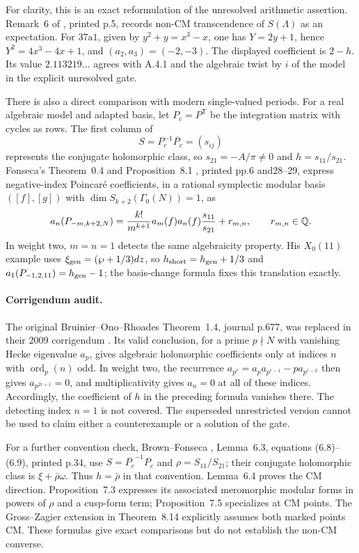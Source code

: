 For clarity, this is an exact reformulation of the unresolved arithmetic assertion. Remark~6 of \cite{EllAGOR2015}, printed p.5, records non-CM transcendence of $S(\Lambda)$ as an expectation. For $37\mathrm a1$, given by $y^2+y=x^3-x$, one has $Y=2y+1$, hence $Y^2=4x^3-4x+1$, and $(a_2,a_3)=(-2,-3)$. The displayed coefficient is $2-h$. Its value $2.113219\ldots$ agrees with A.4.1 and the algebraic twist by $i$ of the model in the explicit unresolved gate.

There is also a direct comparison with modern single-valued periods. For a real algebraic model and adapted basis, let $P_c=P^{\mathsf T}$ be the integration matrix with cycles as rows. The first column of
\[
 S=P_c^{-1}\overline{P_c}=(s_{ij})
\]
represents the conjugate holomorphic class, so $s_{21}=-A/\pi\ne0$ and $h=s_{11}/s_{21}$. Fonseca's Theorem~0.4 and Proposition~8.1 \cite{EllFonseca2020}, printed pp.6 and28--29, express negative-index Poincar\'e coefficients, in a rational symplectic modular basis $([f],[g])$ with $\dim S_{k+2}(\Gamma_0(N))=1$, as
\[
 a_n(P_{-m,k+2,N})
 =\frac{k!}{m^{k+1}}a_m(f)a_n(f)\frac{s_{11}}{s_{21}}+r_{m,n},
 \qquad r_{m,n}\in\mathbb Q.
\]
In weight two, $m=n=1$ detects the same algebraicity property. His $X_0(11)$ example uses $\xi_{\rm gen}=(\wp+1/3)dz$, so $h_{\rm short}=h_{\rm gen}+1/3$ and $a_1(P_{-1,2,11})=h_{\rm gen}-1$; the basis-change formula fixes this translation exactly.

\paragraph{Corrigendum audit.}
The original Bruinier--Ono--Rhoades Theorem~1.4, journal p.677, was replaced in their 2009 corrigendum \cite{EllBORCorr2009}. Its valid conclusion, for a prime $p\nmid N$ with vanishing Hecke eigenvalue $a_p$, gives algebraic holomorphic coefficients only at indices $n$ with $\operatorname{ord}_p(n)$ odd. In weight two, the recurrence
$a_{p^r}=a_p a_{p^{r-1}}-p a_{p^{r-2}}$
then gives $a_{p^{2r+1}}=0$, and multiplicativity gives $a_n=0$ at all of these indices. Accordingly, the coefficient of $h$ in the preceding formula vanishes there. The detecting index $n=1$ is not covered. The superseded unrestricted version cannot be used to claim either a counterexample or a solution of the gate.

For a further convention check, Brown--Fonseca \cite{EllBrownFonseca2025}, Lemma~6.3, equations (6.8)--(6.9), printed p.34, use $S=\overline{P_c}^{-1}P_c$ and $\rho=S_{11}/S_{21}$; their conjugate holomorphic class is $\xi+\bar\rho\omega$. Thus $h=\bar\rho$ in that convention. Lemma~6.4 proves the CM direction. Proposition~7.3 expresses its associated meromorphic modular forms in powers of $\rho$ and a cusp-form term; Proposition~7.5 specializes at CM points. The Gross--Zagier extension in Theorem~8.14 explicitly assumes both marked points CM. These formulas give exact comparisons but do not establish the non-CM converse.


